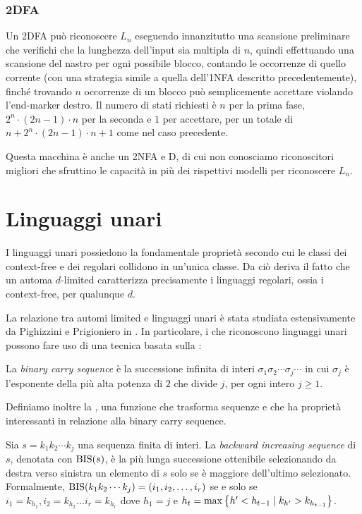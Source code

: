 \subsubsection{2DFA}
Un 2DFA può riconoscere $L_n$ eseguendo innanzitutto una scansione preliminare che verifichi che la lunghezza dell'input sia multipla di $n$, quindi effettuando una scansione del nastro per ogni possibile blocco, contando le occorrenze di quello corrente (con una strategia simile a quella dell'1NFA descritto precedentemente), finché trovando $n$ occorrenze di un blocco può semplicemente accettare violando l'end-marker destro. Il numero di stati richiesti è $n$ per la prima fase, $2^n\cdot (2n-1)\cdot n$ per la seconda e $1$ per accettare, per un totale di $n+2^n\cdot (2n-1)\cdot n+1$ come nel caso precedente.

Questa macchina è anche un 2NFA e D, di cui non conosciamo riconoscitori migliori che sfruttino le capacità in più dei rispettivi modelli per riconoscere $L_n$.



\section{Linguaggi unari}\label{sec:wit:un}
I linguaggi unari possiedono la fondamentale proprietà secondo cui le classi dei context-free e dei regolari collidono in un'unica classe. Da ciò deriva il fatto che un automa $d$-limited caratterizza precisamente i linguaggi regolari, ossia i context-free, per qualunque $d$.

La relazione tra automi limited e linguaggi unari è stata studiata estensivamente da Pighizzini e Prigioniero in \cite{Pighizzini:19:limitedunary}. In particolare, i  che riconoscono linguaggi unari possono fare uso di una tecnica basata sulla :
\begin{defin}
	La \emph{binary carry sequence} è la successione infinita di interi $\sigma_1\sigma_2\cdots\sigma_j\cdots$ in cui $\sigma_j$ è l'esponente della più alta potenza di $2$ che divide $j$, per ogni intero $j\geq1$.
\end{defin}

Definiamo inoltre la , una funzione che trasforma sequenze e che ha proprietà interessanti in relazione alla binary carry sequence.
\begin{defin}
	Sia $s=k_1k_2\cdots k_j$ una sequenza finita di interi. La \emph{backward increasing sequence} di $s$, denotata con $\mathrm{BIS}(s)$, è la più lunga successione ottenibile selezionando da destra verso sinistra un elemento di $s$ solo se è maggiore dell'ultimo selezionato. Formalmente, $\mathrm{BIS}(k_1k_2\cdots k_j)=(i_1,i_2,\dots,i_r)$ se e solo se $i_1=k_{h_1},i_2=k_{h_2}\dots i_r=k_{h_r}$ dove $h_1=j$ e $h_t=\max\left\{ h'<h_{t-1}\mid k_{h'}>k_{h_{t-1}} \right\}$.
\end{defin}

